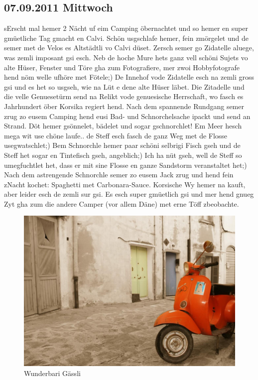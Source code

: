 \subsection{07.09.2011 Mittwoch}

sErscht mal hemer 2 Nächt uf eim Camping öbernachtet und so hemer en super gmüetliche Tag gmacht en Calvi.
Schön usgschlafe hemer, fein zmörgelet und de semer met de Velos es Altstädtli vo Calvi düset.
Zersch semer go Zidatelle aluege, was zemli imposant gsi esch.
Neb de hoche Mure hets ganz vell schöni Sujets vo alte Hüser, Fenster und Töre gha zum Fotografiere, mer zwoi Hobbyfotografe hend nöm welle ufhöre met Fötele;) De Innehof vode Zidatelle esch na zemli gross gsi und es het so usgseh, wie na Lüt e dene alte Hüser läbet.
Die Zitadelle und die velle Genuesetürm send na Relikt vode genuesische Herrschaft, wo fasch es Jahrhundert öber Korsika regiert hend.
Nach dem spannende Rundgang semer zrug zo eusem Camping hend eusi Bad- und Schnorchelsache ipackt und send an Strand.
Döt hemer gsönnelet, bädelet und sogar gschnorchlet! Em Meer hesch mega wit use chöne laufe..
de Steff esch fasch de ganz Weg met de Flosse usegwatschlet;) Bem Schnorchle hemer paar schöni selbrigi Fisch gseh und de Steff het sogar en Tintefisch gseh, angeblich;) Ich ha nüt gseh, well de Steff so umegfuchtlet het, dass er mit sine Flosse en ganze Sandstorm veranstaltet het;) Nach dem astrengende Schnorchle semer zo eusem Jack zrug und hend fein zNacht kochet: Spaghetti met Carbonara-Sauce.
Korsische Wy hemer na kauft, aber leider esch de zemli sur gsi.
Es esch super gmüetlich gsi und mer hend gnueg Zyt gha zum die andere Camper (vor allem Däne) met erne Töff zbeobachte.

\begin{figure}[H]
    \centering
    \includegraphics[width=\textwidth]{../Bilder/Korsika/25.jpg}
    \caption{Wunderbari Gässli}
    \label{img:Korsika2}
\end{figure}
\pagebreak

